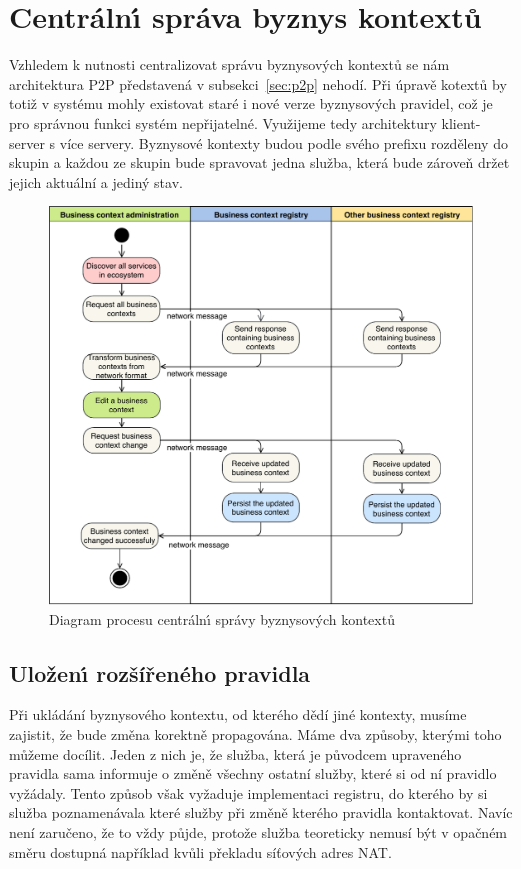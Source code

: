 \section{Centráln\'{\i} správa byznys kontextů}

Vzhledem k nutnosti centralizovat správu byznysových kontextů se nám
architektura \gls{P2P} představená v subsekci~\ref{sec:p2p} nehodí.
Při úpravě kotextů by totiž v systému mohly existovat staré i nové verze
byznysových pravidel, což je pro správnou funkci systém nepřijatelné.
Využijeme tedy architektury klient-server s více servery.
Byznysové kontexty budou podle svého prefixu rozděleny do skupin
a každou ze skupin bude spravovat jedna služba, která bude zároveň
držet jejich aktuální a jediný stav.

\begin{figure}
    \centering
    \includegraphics[keepaspectratio=true, width=0.8\linewidth]{figures/business-context-management.pdf}
    \caption{Diagram procesu centráln\'{\i} správy byznysov\'ych kontextů}
    \label{fig:business-context-management}
\end{figure} %

\subsection{Uložen\'{\i} rozšířeného pravidla}\label{sec:saving-context}

Při ukládání byznysového kontextu, od kterého dědí jiné kontexty, musíme zajistit, že
bude změna korektně propagována. Máme dva způsoby, kterými toho můžeme docílit. Jeden z nich je,
že služba, která je původcem upraveného pravidla sama informuje o změně všechny ostatní služby,
které si od ní pravidlo vyžádaly. Tento způsob však vyžaduje implementaci registru, do kterého by
si služba poznamenávala které služby při změně kterého pravidla kontaktovat. Navíc není zaručeno,
že to vždy půjde, protože služba teoreticky nemusí být v opačném směru dostupná \textendash\xspace například
kvůli překladu síťových adres \gls{NAT}.

